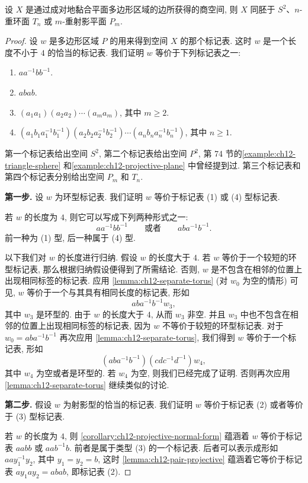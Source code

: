 \begin{theorem}[分类定理]
\label{theorem:ch12-classification}
设 $X$ 是通过成对地黏合平面多边形区域的边所获得的商空间, 则 $X$ 同胚于 $S^{2}$、$n$-重环面 $T_{n}$ 或 $m$-重射影平面 $P_{m}$.
\end{theorem}

\begin{proof}
设 $w$ 是多边形区域 $P$ 的用来得到空间 $X$ 的那个标记表. 这时 $w$ 是一个长度不小于 $4$ 的恰当的标记表. 我们证明 $w$ 等价于下列标记表之一:
\begin{enumerate}[(1)]
\item $aa^{-1}bb^{-1}$.
\item $abab$.
\item $(a_{1}a_{1})(a_{2}a_{2})\cdots(a_{m}a_{m})$, 其中 $m\geqslant 2$.
\item $(a_{1}b_{1}a_{1}^{-1}b_{1}^{-1})(a_{2}b_{2}a_{2}^{-1}b_{2}^{-1})\cdots(a_{n}b_{n}a_{n}^{-1}b_{n}^{-1})$, 其中 $n\geqslant 1$.
\end{enumerate}
第一个标记表给出空间 $S^{2}$, 第二个标记表给出空间 $P^{2}$, 第 74 节的\cref{example:ch12-triangle-sphere} 和\cref{example:ch12-projective-plane} 中曾经提到过. 第三个标记表和第四个标记表分别给出空间 $P_{m}$ 和 $T_{n}$.

\textbf{第一步.} 设 $w$ 为环型标记表. 我们证明 $w$ 等价于标记表 (1) 或 (4) 型标记表.

若 $w$ 的长度为 $4$, 则它可以写成下列两种形式之一:
\[
aa^{-1}bb^{-1}\qquad\text{或者}\qquad aba^{-1}b^{-1}.
\]
前一种为 (1) 型, 后一种属于 (4) 型.

以下我们对 $w$ 的长度进行归纳. 假设 $w$ 的长度大于 $4$. 若 $w$ 等价于一个较短的环型标记表, 那么根据归纳假设便得到了所需结论. 否则, $w$ 是不包含在相邻的位置上出现相同标签的标记表. 应用 \cref{lemma:ch12-separate-torus} (对 $w_{0}$ 为空的情形) 可见, $w$ 等价于一个与其具有相同长度的标记表, 形如
\[
aba^{-1}b^{-1}w_{3},
\]
其中 $w_{3}$ 是环型的. 由于 $w$ 的长度大于 $4$, 从而 $w_{3}$ 非空. 并且 $w_{3}$ 中也不包含在相邻的位置上出现相同标签的标记表, 因为 $w$ 不等价于较短的环型标记表. 对于 $w_{0}=aba^{-1}b^{-1}$ 再次应用 \cref{lemma:ch12-separate-torus}, 我们得到 $w$ 等价于一个标记表, 形如
\[
(aba^{-1}b^{-1})(cdc^{-1}d^{-1})w_{4},
\]
其中 $w_{4}$ 为空或者是环型的. 若 $w_{4}$ 为空, 则我们已经完成了证明. 否则再次应用 \cref{lemma:ch12-separate-torus} 继续类似的讨论.

\textbf{第二步.} 假设 $w$ 为射影型的恰当的标记表. 我们证明 $w$ 等价于标记表 (2) 或者等价于 (3) 型标记表.

若 $w$ 的长度为 $4$, 则 \cref{corollary:ch12-projective-normal-form} 蕴涵着 $w$ 等价于标记表 $aabb$ 或 $aab^{-1}b$. 前者是属于类型 (3) 的一个标记表. 后者可以表示成形如 $aay_{1}^{-1}y_{2}$, 其中 $y_{1}=y_{2}=b$, 这时 \cref{lemma:ch12-pair-projective} 蕴涵着它等价于标记表 $ay_{1}ay_{2}=abab$, 即标记表 (2).


\end{proof}
